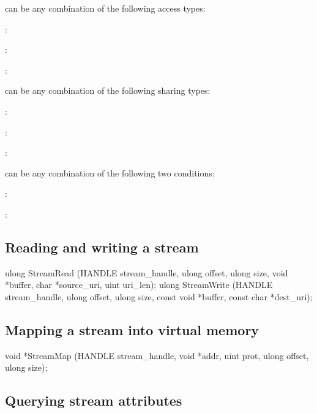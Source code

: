 can be any combination of the following access types:
\begin{compactitem}
\item {}:
\item {}:
\item {}:
\end{compactitem}


 can be any combination of the following sharing types:
\begin{compactitem}
\item {}:
\item {}:
\item {}:
\end{compactitem}


 can be any combination of the following two conditions:
\begin{compactitem}
\item {}:
\item {}:
\end{compactitem}



\subsection*{Reading and writing a stream}

\begin{paldef}
ulong StreamRead (HANDLE stream_handle,
                  ulong offset, ulong size, void *buffer,
                  char *source_uri, uint uri_len);
ulong StreamWrite (HANDLE stream_handle,
                   ulong offset, ulong size,
                   const void *buffer,
                   const char *dest_uri);
\end{paldef}


\subsection*{Mapping a stream into virtual memory}

\begin{paldef}
void *StreamMap (HANDLE stream_handle, void *addr,
                 uint prot, ulong offset, ulong size);
\end{paldef}



\subsection*{Querying stream attributes}

